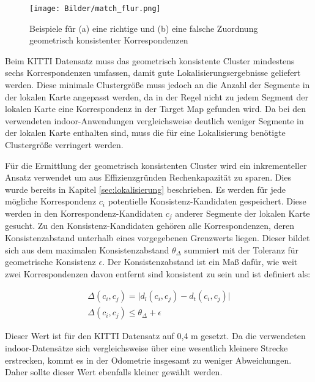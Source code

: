 \begin{figure}
	\centering
	\texttt{[image: Bilder/match\_flur.png]}
	\caption{Beispiele für (a) eine richtige und (b) eine falsche Zuordnung geometrisch konsistenter Korrespondenzen}
	\label{fig:vgl_match_flur}
\end{figure}

Beim KITTI Datensatz muss das geometrisch konsistente Cluster mindestens sechs Korrespondenzen umfassen, damit gute Lokalisierungsergebnisse geliefert werden. Diese minimale Clustergröße muss jedoch an die Anzahl der Segmente in der lokalen Karte angepasst werden, da in der Regel nicht zu jedem Segment der lokalen Karte eine Korrespondenz in der Target Map gefunden wird. Da bei den verwendeten indoor-Anwendungen vergleichsweise deutlich weniger Segmente in der lokalen Karte enthalten sind, muss die für eine Lokalisierung benötigte Clustergröße verringert werden. 

Für die Ermittlung der geometrisch konsistenten Cluster wird ein inkrementeller Ansatz verwendet um aus Effizienzgründen Rechenkapazität zu sparen. Dies wurde bereits in Kapitel \ref{sec:lokalisierung} beschrieben. Es werden für jede mögliche Korrespondenz $c_i$ potentielle Konsistenz-Kandidaten gespeichert. Diese werden in den Korrespondenz-Kandidaten $ c_j $ anderer Segmente der lokalen Karte gesucht. Zu den Konsistenz-\linebreak Kandidaten gehören alle Korrespondenzen, deren Konsistenzabstand unterhalb eines vorgegebenen Grenzwerts liegen. Dieser bildet sich aus dem maximalen Konsistenzabstand $ \theta_\Delta $ summiert mit der Toleranz für geometrische Konsistenz $\epsilon$. Der Konsistenzabstand ist ein Maß dafür, wie weit zwei Korrespondenzen davon entfernt sind konsistent zu sein und ist definiert als: 

\begin{subequations}
	\begin{align}
		\Delta(c_i,c_j) = \vert d_l(c_i,c_j)-d_t(c_i,c_j) \vert \\
		\Delta(c_i,c_j) \leq \theta_\Delta+ \epsilon
	\end{align}
\end{subequations}

Dieser Wert ist für den KITTI Datensatz auf 0,4 m gesetzt. Da die verwendeten indoor-Datensätze sich vergleichsweise über eine wesentlich kleinere Strecke erstrecken, kommt es in der Odometrie insgesamt zu weniger Abweichungen. Daher sollte dieser Wert ebenfalls kleiner gewählt werden. 


